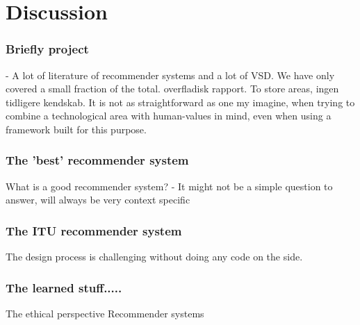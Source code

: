 \section{Discussion}
\subsubsection*{Briefly project}
- A lot of literature of recommender systems and a lot of VSD. We have only covered a small fraction of the total.\newline
overfladisk rapport. To store areas, ingen tidligere kendskab. 
It is not as straightforward as one my imagine, when trying to combine a technological area with human-values in mind, even when using a framework built for this purpose. 

\subsubsection*{The 'best' recommender system}
What is a good recommender system?
- It might not be a simple question to answer, will always be very context specific\newline

\subsubsection{The ITU recommender system}
The design process is challenging without doing any code on the side. 

\subsubsection*{The learned stuff.....}
The ethical perspective\newline
Recommender systems


